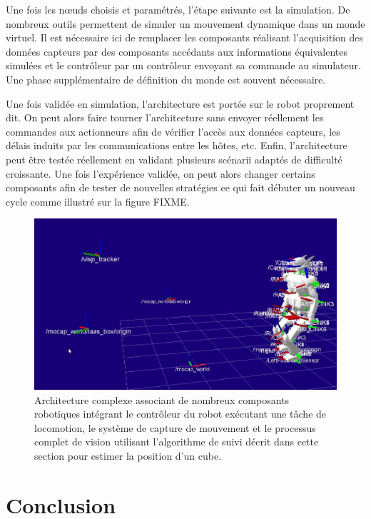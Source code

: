 Une fois les n\oe uds choisis et paramétrés, l'étape suivante est la
simulation. De nombreux outils permettent de simuler un mouvement
dynamique dans un monde virtuel. Il est nécessaire ici de remplacer
les composants réalisant l'acquisition des données capteurs par des
composants accédants aux informations équivalentes simulées et le
contrôleur par un contrôleur envoyant sa commande au simulateur. Une
phase supplémentaire de définition du monde est souvent nécessaire.


Une fois validée en simulation, l'architecture est portée sur le robot
proprement dit. On peut alors faire tourner l'architecture sans
envoyer réellement les commandes aux actionneurs afin de vérifier
l'accès aux données capteurs, les délais induits par les
communications entre les hôtes, etc. Enfin, l'architecture peut être
testée réellement en validant plusieurs scénarii adaptés de difficulté
croissante. Une fois l'expérience validée, on peut alors changer
certains composants afin de tester de nouvelles stratégies ce qui fait
débuter un nouveau cycle comme illustré sur la figure FIXME.


\begin{figure}
  \begin{center}
    \includegraphics[width=.95\linewidth]{src/chap4-integration/rviz-full.jpg}
  \end{center}
  \caption{Architecture complexe associant de nombreux composants
    robotiques intégrant le contrôleur du robot exécutant une tâche de
    locomotion, le système de capture de mouvement et le processus
    complet de vision utilisant l'algorithme de suivi décrit dans
    cette section pour estimer la position d'un cube.}
\end{figure}



\section{Conclusion}


